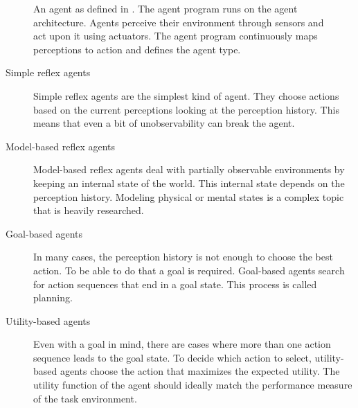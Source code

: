 \documentclass[../main.tex]{subfiles}
\begin{document}
\begin{figure}[t]
    \centering
    \caption{An agent as defined in \autocite{Russel2022}.
        The agent program runs on the agent architecture.
        Agents perceive their environment through sensors and act upon it using actuators.
        The agent program continuously maps perceptions to action and defines the agent type.}
    \label{fig:agent_overview}
\end{figure}

\begin{description}
    \item[Simple reflex agents]
        Simple reflex agents are the simplest kind of agent.
        They choose actions based on the current perceptions looking at the perception history.
        This means that even a bit of unobservability can break the agent.
    \item[Model-based reflex agents]
        Model-based reflex agents deal with partially observable environments
        by keeping an internal state of the world.
        This internal state depends on the perception history.
        Modeling physical or mental states is a complex topic that is heavily researched.
    \item[Goal-based agents]
        In many cases, the perception history is not enough to choose the best action.
        To be able to do that a goal is required.
        Goal-based agents search for action sequences that end in a goal state.
        This process is called planning.
    \item[Utility-based agents]
        Even with a goal in mind, there are cases where more than one action sequence leads to the goal state.
        To decide which action to select, utility-based agents choose the action that maximizes the expected utility.
        The utility function of the agent should ideally match the performance measure of the task environment.
\end{description}
\end{document}
